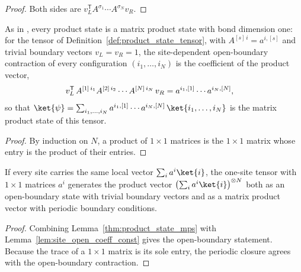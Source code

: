 \begin{proof}
    \leanok
    Both sides are $v_L^{\mathsf T}A^{\sigma_1}\cdots A^{\sigma_N}v_R$.
\end{proof}

\begin{lemma}[Product states are MPS with $D=1$]\label{thm:product_state_mps}
    \leanok
    As in \cite[Appendix~A, ``Product states'']{Cirac2021Matrix}, every product
    state is a matrix product state with bond dimension one:
    for the tensor of Definition~\ref{def:product_state_tensor}, with
    $A^{[s]\,i}=a^{i,[s]}$ and trivial boundary vectors $v_L=v_R=1$, the
    site-dependent open-boundary contraction of every configuration
    $(i_1,\ldots,i_N)$ is the coefficient of the product vector,
    \begin{align}
        v_L^{\mathsf T}\,A^{[1]\,i_1}A^{[2]\,i_2}\cdots A^{[N]\,i_N}\,v_R
         & = a^{i_1,[1]}\cdots a^{i_N,[N]},
        \notag
    \end{align}
    so that
    $\ket{\psi}=\sum_{i_1,\ldots,i_N}a^{i_1,[1]}\cdots a^{i_N,[N]}\,
        \ket{i_1,\ldots,i_N}$ is the matrix product state of this tensor.
\end{lemma}

\begin{proof}
    \leanok
    By induction on $N$, a product of $1\times1$ matrices is the $1\times1$
    matrix whose entry is the product of their entries.
\end{proof}

\begin{corollary}\label{cor:product_state_ti}
    \leanok
    If every site carries the same local vector $\sum_i a^i\ket{i}$, the
    one-site tensor with $1\times1$ matrices $a^i$ generates the product vector
    $\bigl(\sum_i a^i\ket{i}\bigr)^{\otimes N}$ both as an open-boundary state
    with trivial boundary vectors and as a matrix product vector with periodic
    boundary conditions.
\end{corollary}

\begin{proof}
    \leanok
    Combining Lemma~\ref{thm:product_state_mps} with
    Lemma~\ref{lem:site_open_coeff_const} gives the open-boundary statement.
    Because the trace of a $1\times1$ matrix is its sole entry, the periodic
    closure agrees with the open-boundary contraction.
\end{proof}

